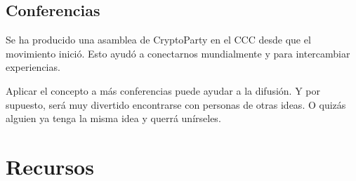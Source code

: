 \documentclass[10pt,a5paper,twoside,,]{book}
\begin{document}
\subsection{Conferencias}\label{conferencias}

Se ha producido una asamblea de CryptoParty en el CCC desde que el
movimiento inició. Esto ayudó a conectarnos mundialmente y para
intercambiar experiencias.

Aplicar el concepto a más conferencias puede ayudar a la difusión. Y por
supuesto, será muy divertido encontrarse con personas de otras ideas. O
quizás alguien ya tenga la misma idea y querrá unírseles.

\section{Recursos}\label{recursos}
\end{document}

